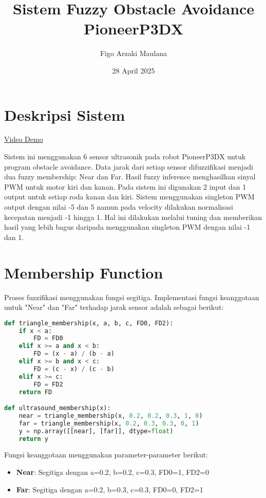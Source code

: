 \documentclass[a4paper,11pt]{article}
\title{Sistem Fuzzy Obstacle Avoidance PioneerP3DX}
\author{Figo Arzaki Maulana}
\date{28 April 2025}
\newcommand{\youtubelink}{\href{https://youtu.be/wl1X7vWXRO4}{Video Demo}}
\begin{document}
\maketitle

\section{Deskripsi Sistem}
\youtubelink

Sistem ini menggunakan 6 sensor ultrasonik pada robot PioneerP3DX untuk program obstacle avoidance. Data jarak dari setiap sensor difuzzifikasi menjadi dua fuzzy membership: Near dan Far. Hasil fuzzy inference menghasilkan sinyal PWM untuk motor kiri dan kanan. Pada sistem ini digunakan 2 input dan 1 output untuk setiap roda kanan dan kiri. Sistem menggunakan singleton PWM output dengan nilai -5 dan 5 namun pada velocity dilakukan normalisasi kecepatan menjadi -1 hingga 1. Hal ini dilakukan melalui tuning dan memberikan hasil yang lebih bagus daripada menggunakan singleton PWM dengan nilai -1 dan 1.

\section{Membership Function}
Proses fuzzifikasi menggunakan fungsi segitiga. Implementasi fungsi keanggotaan untuk "Near" dan "Far" terhadap jarak sensor adalah sebagai berikut:

\begin{lstlisting}[language=Python, caption=Implementasi Fungsi Keanggotaan Segitiga]
def triangle_membership(x, a, b, c, FD0, FD2):
    if x < a:
        FD = FD0
    elif x >= a and x < b:
        FD = (x - a) / (b - a)
    elif x >= b and x < c:
        FD = (c - x) / (c - b)
    elif x >= c:
        FD = FD2
    return FD

def ultrasound_membership(x):
    near = triangle_membership(x, 0.2, 0.2, 0.3, 1, 0)
    far = triangle_membership(x, 0.2, 0.3, 0.3, 0, 1)
    y = np.array([[near], [far]], dtype=float)
    return y
\end{lstlisting}

Fungsi keanggotaan menggunakan parameter-parameter berikut:
\begin{itemize}
    \item \textbf{Near}: Segitiga dengan a=0.2, b=0.2, c=0.3, FD0=1, FD2=0
    \item \textbf{Far}: Segitiga dengan a=0.2, b=0.3, c=0.3, FD0=0, FD2=1
\end{itemize}
\end{document}
